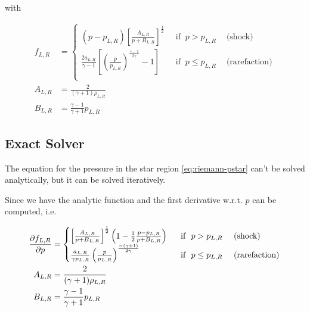 with 

\begin{align}
	f_{L,R} &= 
		\begin{cases}
			(p - p_{L,R}) \left[ \frac{A_{L,R}}{p + B_{L,R}} \right]^{\frac{1}{2}}
				& ~\text{ if } ~ p > p_{L,R} ~ \quad \text{(shock)} \\
			\frac{2 a_{L,R}}{\gamma - 1} \left[ \left( \frac{p}{p_{L,R}} \right)^ \frac{\gamma -1}{2 \gamma} - 1 \right]
				& ~\text{ if } ~ p \leq p_{L,R} ~ \quad \text{(rarefaction)} \label{eq:riemann-pstar}\\
		\end{cases} \\
	A_{L,R} &= 
		\frac{2}{(\gamma + 1) \rho_{L,R}}\\
	B_{L,R} &= 
		\frac{\gamma - 1}{\gamma + 1} p_{L,R}
\end{align}





























\subsection{Exact Solver}


The equation for the pressure in the star region \ref{eq:riemann-pstar} can't be solved analytically, but it can be solved iteratively.

Since we have the analytic function and the first derivative w.r.t. $p$ can be computed, i.e.

\begin{align*}
	\frac{\partial f_{L,R}}{\partial p} &= 
		\begin{cases}
			\left[ \frac{A_{L,R}}{p + B_{L,R}} \right]^{\frac{1}{2}} \left( 1 - \frac{1}{2} \frac{p - p_{L,R}}{p + B_{L,R}} \right) 
				& ~\text{ if } ~ p > p_{L,R} ~ \quad \text{(shock)} \\
			\frac{a_{L,R}}{\gamma p_{L,R}}  \left( \frac{p}{p_{L,R}} \right)^ \frac{-(\gamma+1)}{2 \gamma}
				& ~\text{ if } ~ p \leq p_{L,R} ~ \quad \text{(rarefaction)} \label{eq:riemann-pstar-dp}\\
		\end{cases} \\
	A_{L,R} &= 
		\frac{2}{(\gamma + 1) \rho_{L,R}}\\
	B_{L,R} &= 
		\frac{\gamma - 1}{\gamma + 1} p_{L,R}
\end{align*}


